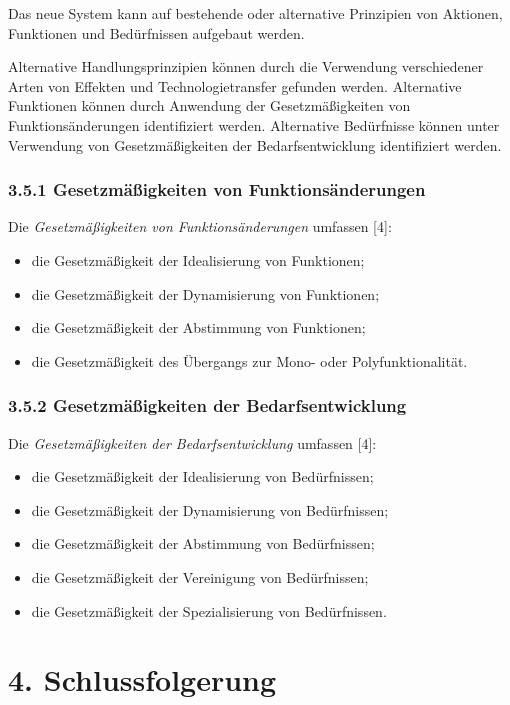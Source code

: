 \documentclass[11pt,a4paper]{article}
\begin{document}
Das neue System kann auf bestehende oder alternative Prinzipien von Aktionen,
Funktionen und Bedürfnissen aufgebaut werden.

Alternative Handlungsprinzipien können durch die Verwendung verschiedener
Arten von Effekten und Technologietransfer gefunden werden. Alternative
Funktionen können durch Anwendung der Gesetzmäßigkeiten von
Funktionsänderungen identifiziert werden. Alternative Bedürfnisse können unter
Verwendung von Gesetzmäßigkeiten der Bedarfsentwicklung identifiziert werden.

\subsubsection{3.5.1 Gesetzmäßigkeiten von Funktionsänderungen}

Die \emph{Gesetzmäßigkeiten von Funktionsänderungen} umfassen [4]:
\begin{itemize}[noitemsep]
\item die Gesetzmäßigkeit der Idealisierung von Funktionen;
\item die Gesetzmäßigkeit der Dynamisierung von Funktionen;
\item die Gesetzmäßigkeit der Abstimmung von Funktionen;
\item die Gesetzmäßigkeit des Übergangs zur Mono- oder Polyfunktionalität. 
\end{itemize}

\subsubsection{3.5.2 Gesetzmäßigkeiten der Bedarfsentwicklung}
Die \emph{Gesetzmäßigkeiten  der Bedarfsentwicklung} umfassen [4]:
\begin{itemize}[noitemsep]
\item die Gesetzmäßigkeit der Idealisierung von Bedürfnissen;
\item die Gesetzmäßigkeit der Dynamisierung von Bedürfnissen;
\item die Gesetzmäßigkeit der Abstimmung von Bedürfnissen;
\item die Gesetzmäßigkeit der Vereinigung von Bedürfnissen;
\item die Gesetzmäßigkeit der Spezialisierung von Bedürfnissen.
\end{itemize}

\section{4. Schlussfolgerung}
\end{document}
